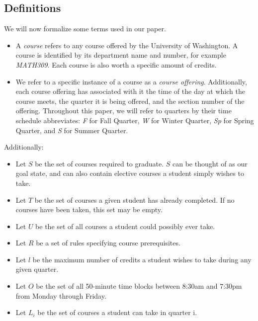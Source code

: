 \documentclass[11pt]{article} %
\begin{document}
\subsection{Definitions} We will now formalize some terms used in our paper.
\begin{itemize} \item A {\it course} refers to any course offered by the
University of Washington. A course is identified by its department name and
number, for example {\it MATH309}. Each course is also worth a specific amount
of credits. \item We refer to a specific instance of a course as a {\it course
offering}. Additionally, each course offering  has associated with it the time of
the day at which the course meets, the quarter it is being offered, and the
section number of the offering. Throughout this paper, we will refer to quarters
by their time schedule abbreviates: {\it F} for Fall Quarter, {\it W} for Winter
Quarter, {\it Sp} for Spring Quarter, and {\it S} for Summer Quarter.
\end{itemize}

Additionally: \begin{itemize} \item Let $S$ be the set of courses required to
graduate. $S$ can be thought of as our goal state, and can also contain elective
courses a student simply wishes to take.  \item Let $T$ be the set of courses
a given student has already completed. If no courses have been taken, this set
may be empty.  \item Let $U$ be the set of all courses a student could possibly
ever take.  \item Let $R$ be a set of rules specifying course prerequisites.
\item Let $l$ be the maximum number of credits a student wishes to take during
any given quarter.  \item Let $O$ be the set of all 50-minute time blocks
between 8:30am and 7:30pm from Monday through Friday. \item Let $L_i$ be the set
of courses a student can take in quarter i. \end{itemize}
\end{document}
